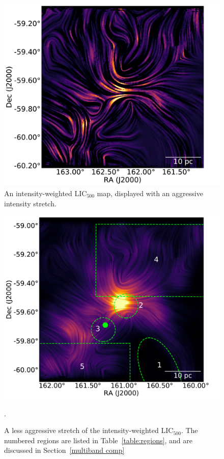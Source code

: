 \begin{figure}[!htbp]
\centering
\includegraphics[width=\textwidth]{figures/carina/lic2_han51}
\caption[~An intensity-weighted  map, displayed with an aggressive intensity stretch.]{An intensity-weighted LIC$_{500}$ map, displayed with an aggressive intensity stretch.}
\label{fig:lic2_han51}
\end{figure}

\begin{figure}[!htbp]
\centering
\includegraphics[width=\textwidth]{figures/carina/lic_mult}
\caption[~A less aggressive stretch of the intensity-weighted .]{A less aggressive stretch of the intensity-weighted LIC$_{500}$. The numbered regions are listed in Table~\ref{table:regions}, and are discussed in Section~\ref{multiband comp}}.
\label{fig:lic_map}
\end{figure}

